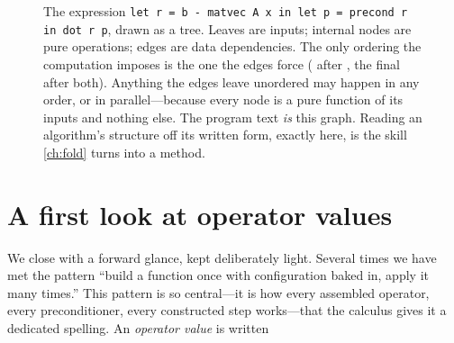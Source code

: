 \begin{figure}[t]
\centering
{}
\caption[An expression is a dependency tree with no hidden order]{The expression
\lstinline[style=l4style]|let r = b - matvec A x in let p = precond r in dot r p|,
drawn as a tree. Leaves are inputs; internal nodes are pure operations; edges are
data dependencies. The only ordering the computation imposes is the one the edges
force ( after , the final  after both). Anything the
edges leave unordered may happen in any order, or in parallel---because every node
is a pure function of its inputs and nothing else. The program text \emph{is} this
graph. Reading an algorithm's structure off its written form, exactly here, is the
skill \cref{ch:fold} turns into a method.}
\label{fig:exprtree}
\end{figure}

\section{A first look at operator values}

We close with a forward glance, kept deliberately light. Several times we have met
the pattern ``build a function once with configuration baked in, apply it many
times.'' This pattern is so central---it is how every assembled operator, every
preconditioner, every constructed step works---that the calculus gives it a
dedicated spelling. An \emph{operator value} is written

